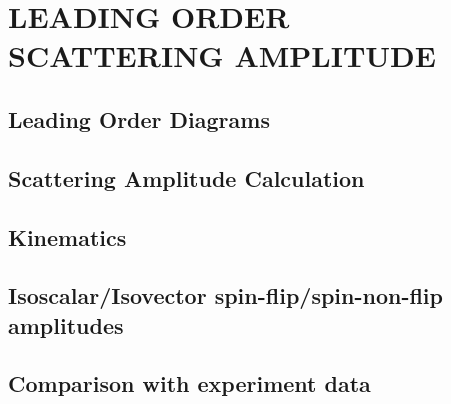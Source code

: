 \chapter{LEADING ORDER SCATTERING AMPLITUDE}

\section{Leading Order Diagrams}
\section{Scattering Amplitude Calculation}
\section{Kinematics}
\section{Isoscalar/Isovector spin-flip/spin-non-flip amplitudes}
\section{Comparison with experiment data}